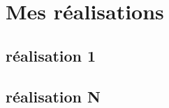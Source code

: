 \chapter{Mes réalisations}
    \lipsum[1]
    
\section{réalisation 1}
    \lipsum[1]

\section{réalisation N}
    \lipsum[1]